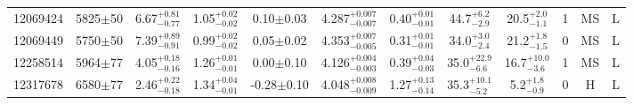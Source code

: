 \begin{longtable}{c|ccccc|ccc|ccc}
12069424 & 5825$\pm$50   & 6.67$_{-0.77}^{+0.81}$    & 1.05$_{-0.02}^{+0.02}$ & 0.10$\pm$0.03     & 4.287$_{-0.007}^{+0.007}$ & 0.40$_{-0.01}^{+0.01}$ & 44.7$_{-2.9}^{+6.2}$      & 20.5$_{-1.1}^{+2.0}$     & 1 &        MS & L \\
12069449 & 5750$\pm$50   & 7.39$_{-0.91}^{+0.89}$    & 0.99$_{-0.02}^{+0.02}$ & 0.05$\pm$0.02     & 4.353$_{-0.005}^{+0.007}$ & 0.31$_{-0.01}^{+0.01}$ & 34.0$_{-2.4}^{+3.0}$      & 21.2$_{-1.5}^{+1.8}$     & 0 &        MS & L \\
12258514 & 5964$\pm$77   & 4.05$_{-0.16}^{+0.18}$    & 1.26$_{-0.01}^{+0.01}$ & 0.00$\pm$0.10     & 4.126$_{-0.003}^{+0.004}$ & 0.39$_{-0.03}^{+0.04}$ & 35.0$_{-6.6}^{+22.9}$     & 16.7$_{-3.6}^{+10.0}$    & 1 &        MS & L \\
12317678 & 6580$\pm$77   & 2.46$_{-0.18}^{+0.22}$    & 1.34$_{-0.01}^{+0.04}$ & -0.28$\pm$0.10    & 4.048$_{-0.009}^{+0.008}$ & 1.27$_{-0.14}^{+0.13}$ & 35.3$_{-5.2}^{+10.1}$     & 5.2$_{-0.9}^{+1.8}$      & 0 &        H & L \\
\end{longtable}
\normalsize
\twocolumn
